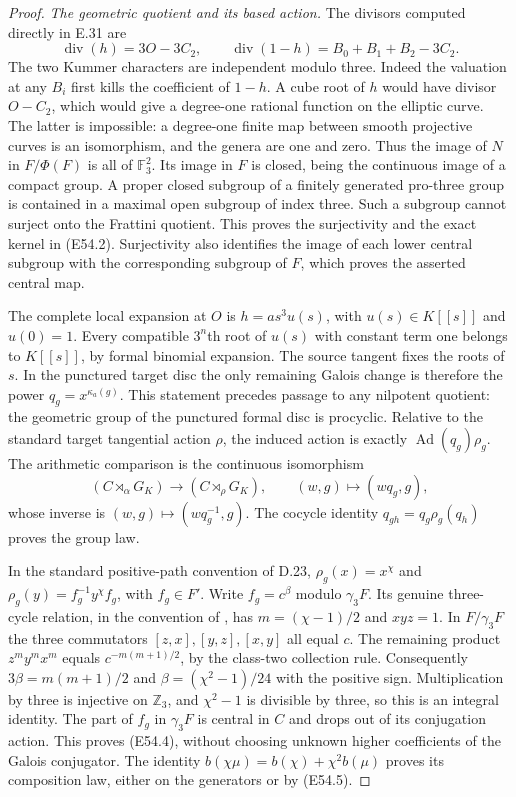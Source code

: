 \begin{proof}
\emph{The geometric quotient and its based action.}
The divisors computed directly in E.31 are
\[
 \operatorname{div}(h)=3O-3C_2,\qquad
 \operatorname{div}(1-h)=B_0+B_1+B_2-3C_2.
 \tag{E54.16}
\]
The two Kummer characters are independent modulo three.
Indeed the valuation at any $B_i$ first kills the coefficient
of $1-h$. A cube root of $h$ would have divisor $O-C_2$,
which would give a degree-one rational function on the
elliptic curve. The latter is impossible: a degree-one finite
map between smooth projective curves is an isomorphism, and
the genera are one and zero.
Thus the image of $N$ in $F/\Phi(F)$ is all of
$\mathbb F_3^2$. Its image in $F$ is closed, being the
continuous image of a compact group. A proper closed
subgroup of a finitely generated pro-three group is contained
in a maximal open subgroup of index three. Such a subgroup
cannot surject onto the Frattini quotient. This proves the
surjectivity and the exact kernel in (E54.2).
Surjectivity also identifies the image of each lower
central subgroup with the corresponding subgroup of $F$,
which proves the asserted central map.

The complete local expansion at $O$ is
$h=a s^3u(s)$, with $u(s)\in K[[s]]$ and $u(0)=1$.
Every compatible $3^n$th root of $u(s)$ with constant term
one belongs to $K[[s]]$, by formal binomial expansion.
The source tangent fixes the roots of $s$. In the punctured
target disc the only remaining Galois change is therefore
the power $q_g=x^{\kappa_a(g)}$. This statement precedes
passage to any nilpotent quotient: the geometric group of
the punctured formal disc is procyclic. Relative to the
standard target tangential action $\rho$, the induced
action is exactly
$\operatorname{Ad}(q_g)\rho_g$.
The arithmetic comparison is the continuous isomorphism
\[
 (C\rtimes_\alpha G_K)\longrightarrow
       (C\rtimes_\rho G_K),\qquad
       (w,g)\longmapsto(wq_g,g),
 \tag{E54.17}
\]
whose inverse is $(w,g)\mapsto(wq_g^{-1},g)$.
The cocycle identity
$q_{gh}=q_g\rho_g(q_h)$ proves the group law.

In the standard positive-path convention of D.23,
$\rho_g(x)=x^\chi$ and
$\rho_g(y)=f_g^{-1}y^\chi f_g$, with $f_g\in F'$.
Write $f_g=c^\beta$ modulo $\gamma_3F$.
Its genuine three-cycle relation, in the convention
of \cite[Theorem~2, equation~(5), and \S3]{A_Furusho2010Hexagon},
has $m=(\chi-1)/2$ and $xyz=1$.
In $F/\gamma_3F$ the three commutators
$[z,x],[y,z],[x,y]$ all equal $c$.
The remaining product $z^my^mx^m$ equals
$c^{-m(m+1)/2}$, by the class-two collection rule.
Consequently
$3\beta=m(m+1)/2$ and
$\beta=(\chi^2-1)/24$ with the positive sign.
Multiplication by three is injective on $\mathbb Z_3$,
and $\chi^2-1$ is divisible by three, so this is an
integral identity. The part of $f_g$ in $\gamma_3F$
is central in $C$ and drops out of its conjugation
action. This proves (E54.4), without choosing
unknown higher coefficients of the Galois conjugator.
The identity
$b(\chi\mu)=b(\chi)+\chi^2b(\mu)$ proves its composition
law, either on the generators or by (E54.5).


\end{proof}
